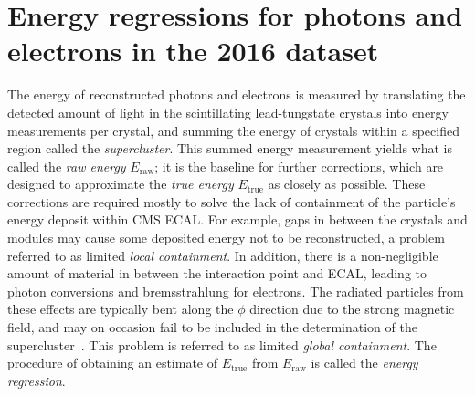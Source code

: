 \clearpage
\section{Energy regressions for photons and electrons in the 2016 dataset}
\label{app:regression}

\newcommand{\Eraw}{\ensuremath{E_\text{raw}}\xspace}
\newcommand{\Etrue}{\ensuremath{E_\text{true}}\xspace}
\newcommand{\Ecorr}{\ensuremath{E_\text{corr}}\xspace}

The energy of reconstructed photons and electrons is measured by translating the detected amount of light in the scintillating lead-tungstate crystals into energy measurements per crystal, and summing the energy of crystals within a specified region called the \textit{supercluster}.
% 
This summed energy measurement yields what is called the \textit{raw energy} $\Eraw$; it is the baseline for further corrections, which are designed to approximate the \textit{true energy} $\Etrue$ as closely as possible.
% 
These corrections are required mostly to solve the lack of containment of the particle's energy deposit within CMS ECAL.
% 
For example, gaps in between the crystals and modules may cause some deposited energy not to be reconstructed, a problem referred to as limited \textit{local containment}.
% 
In addition, there is a non-negligible amount of material in between the interaction point and ECAL, leading to photon conversions and bremsstrahlung for electrons.
% 
The radiated particles from these effects are typically bent along the $\phi$ direction due to the strong magnetic field, and may on occasion fail to be included in the determination of the supercluster~\cite{Chatrchyan:2013dga}.
% 
This problem is referred to as limited \textit{global containment}.
% 
The procedure of obtaining an estimate of $\Etrue$ from $\Eraw$ is called the \textit{energy regression}.


